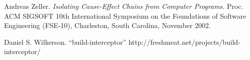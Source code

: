 \documentclass[10pt,letterpaper,twocolumn,english]{article}
\begin{document}
\begin{thebibliography}{99}
\begin{small}
 Andreas Zeller. {\em Isolating Cause-Effect Chains from Computer Programs.} Proc. ACM SIGSOFT 10th International Symposium on the Foundations of Software Engineering (FSE-10), Charleston, South Carolina, November 2002.

 Daniel S. Wilkerson. ``build-interceptor'' http://freshmeat.net/projects/build-interceptor/





%
%


%
%
%
%
%
%
%
\end{small}
\end{thebibliography}
\end{document}
